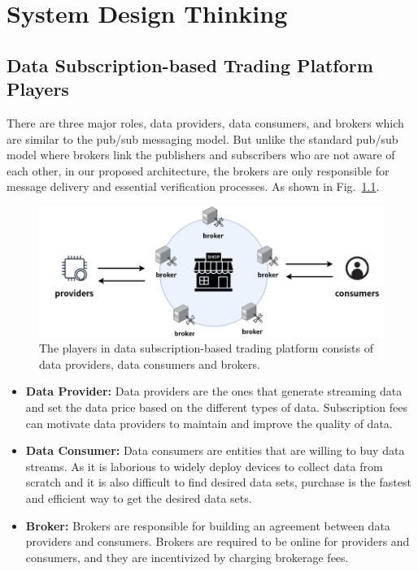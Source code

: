 \clearpage
{}

\newpage
{}
\chapter{System Design Thinking}
\pagestyle{plain}

\begin{spacing}{2.0}
\label{section:design_thinking}
\section{Data Subscription-based Trading Platform Players}
There are three major roles, data providers, data consumers, and brokers which are similar to the pub/sub messaging model. But unlike the standard pub/sub model where brokers link the publishers and subscribers who are not aware of each other, in our proposed architecture, the brokers are only responsible for message delivery and essential verification processes. As shown in Fig.~\ref{fig:pub_sub_model}.

\begin{figure}[H]
    \centering
    \includegraphics[width=4.5in]{img/pub_sub_model}
    \caption{The players in data subscription-based trading platform consists of data providers, data consumers and brokers.}
    \label{fig:pub_sub_model}
\end{figure}

\begin{itemize}
\item \textbf{Data Provider: }
Data providers are the ones that generate streaming data and set the data price based on the different types of data. Subscription fees can motivate data providers to maintain and improve the quality of data.
\item \textbf{Data Consumer: }
Data consumers are entities that are willing to buy data streams. As it is laborious to widely deploy devices to collect data from scratch and it is also difficult to find desired data sets, purchase is the fastest and efficient way to get the desired data sets.
\item \textbf{Broker: }
Brokers are responsible for building an agreement between data providers and consumers. Brokers are required to be online for providers and consumers, and they are incentivized by charging brokerage fees.
\end{itemize}


\end{spacing}

